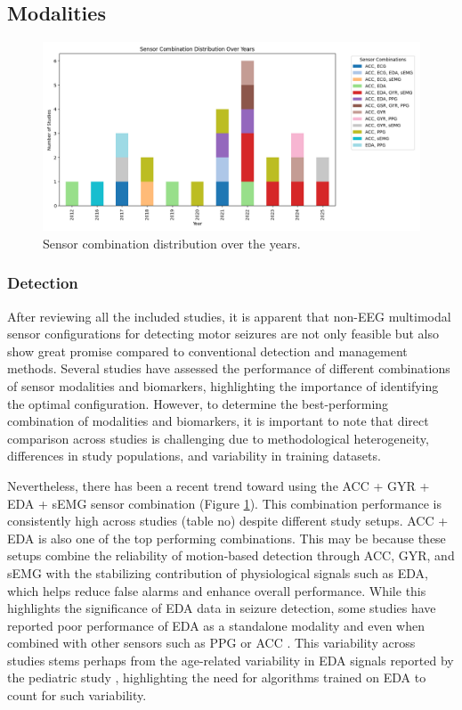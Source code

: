 \subsection{Modalities}

\begin{figure}
    \centering
    \includegraphics[width=1\textwidth]{Discussion/figures/Sensor_Combination_Distribution_Over_the_Years.png}
    \caption{Sensor combination distribution over the years.}
    \label{fig:sensor_comb_over_years}
\end{figure}

\subsubsection{Detection}
After reviewing all the included studies, it is apparent that non-EEG multimodal sensor configurations for detecting motor seizures are not only feasible but also show great promise compared to conventional detection and management methods. Several studies have assessed the performance of different combinations of sensor modalities and biomarkers, highlighting the importance of identifying the optimal configuration. However, to determine the best-performing combination of modalities and biomarkers, it is important to note that direct comparison across studies is challenging due to methodological heterogeneity, differences in study populations, and variability in training datasets.

Nevertheless, there has been a recent trend toward using the ACC + GYR + EDA + sEMG sensor combination (Figure \ref{fig:sensor_comb_over_years}). This combination performance is consistently high across studies (table no) despite different study setups. ACC + EDA is also one of the top performing combinations. This may be because these setups combine the reliability of motion-based detection through ACC, GYR, and sEMG with the stabilizing contribution of physiological signals such as EDA, which helps reduce false alarms and enhance overall performance. While this highlights the significance of EDA data in seizure detection, some studies have reported poor performance of EDA as a standalone modality and even when combined with other sensors such as PPG or ACC \cite{Yu2023-ss, Tang2021-td}. This variability across studies stems perhaps from the age-related variability in EDA signals reported by the pediatric study  \cite{Ge2023-ab}, highlighting the need for algorithms trained on EDA to count for such variability. 


